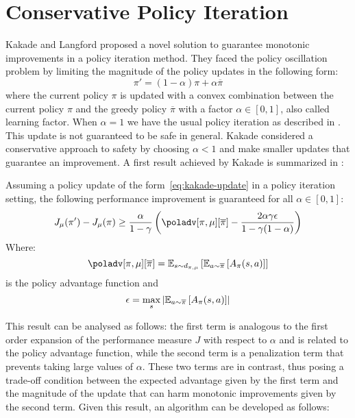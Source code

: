 \section{Conservative Policy Iteration}
\label{sec:cpi}
Kakade and Langford \cite{Kakade02approximatelyoptimal} proposed a novel solution to guarantee monotonic improvements in a policy iteration method. They faced the policy oscillation problem by limiting the magnitude of the policy updates in the following form:
\begin{equation}
\pi' = (1-\alpha )\pi + \alpha\overline{\pi} \label{eq:kakade-update}
\end{equation}
where the current policy $\pi$ is updated with a convex combination between the current policy $\pi$ and the greedy policy $\overline{\pi}$ with a factor $\alpha \in [0,1]$, also called learning factor.
When $\alpha = 1$ we have the usual policy iteration as described in . This update is not guaranteed to be safe in general. Kakade considered a conservative approach to safety by choosing $\alpha < 1$ and make smaller updates that guarantee an improvement.
A first result achieved by Kakade is summarized in :
\begin{theorem}
\label{th:kakade1}
Assuming a policy update of the form~\ref{eq:kakade-update} in a policy iteration setting, the following performance improvement is guaranteed for all $\alpha \in [0,1]$:
\begin{equation}
J_{\mu}(\pi') - J_{\mu}(\pi) \geq \frac{\alpha}{1 - \gamma}\left( \poladv[\pi, \mu][\overline{\pi}] - \frac{2\alpha \gamma \epsilon}{1 - \gamma (1 - \alpha)} \right) \label{eq:kakade-improvement}
\end{equation}
Where:
\begin{equation}
\poladv[\pi, \mu][\overline{\pi}] = \EV[s\sim d_{\pi, \mu}]{ \EV[a\sim\overline{\pi}]{A_{\pi}(s,a)}}
\end{equation}
is the policy advantage function and
\begin{equation}
\epsilon = \max_s \left| \EV[a\sim\overline{\pi}]{A_{\pi}(s,a)} \right|
\end{equation}
\end{theorem}

This result can be analysed as follows: the first term is analogous to the first order expansion of the performance measure $J$ with respect to $\alpha$ and is related to the policy advantage function, while the second term is a penalization term that prevents taking large values of $\alpha$. These two terms are in contrast, thus posing a trade-off condition between the expected advantage given by the first term and the magnitude of the update that can harm monotonic improvements given by the second term. Given this result, an algorithm can be developed as follows:

